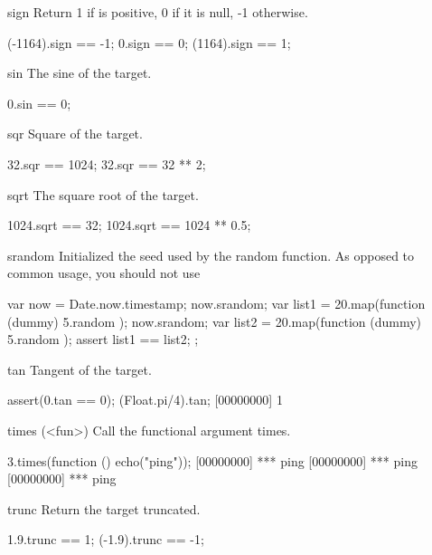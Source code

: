 \begin{urbiscriptapi}
\item[sign]
  Return 1 if \this is positive, 0 if it is null, -1
  otherwise.
\begin{urbiassert}
(-1164).sign == -1;
0.sign       == 0;
(1164).sign  == 1;
\end{urbiassert}

\item[sin]
  The sine of the target.
\begin{urbiassert}
0.sin == 0;
\end{urbiassert}

\item[sqr]
  Square of the target.
\begin{urbiassert}
32.sqr == 1024;
32.sqr == 32 ** 2;
\end{urbiassert}

\item[sqrt]
  The square root of the target.
\begin{urbiassert}
1024.sqrt == 32;
1024.sqrt == 1024 ** 0.5;
\end{urbiassert}

\item[srandom]
  Initialized the seed used by the random function.  As opposed to common
  usage, you should not use
\begin{urbiunchecked}
{
  var now = Date.now.timestamp;
  now.srandom;
  var list1 = 20.map(function (dummy) { 5.random });
  now.srandom;
  var list2 = 20.map(function (dummy) { 5.random });
  assert
  {
    list1 == list2;
  }
};
\end{urbiunchecked}

\item[tan]
  Tangent of the target.
\begin{urbiscript}
assert(0.tan == 0);
(Float.pi/4).tan;
[00000000] 1
\end{urbiscript}

\item[times](<fun>)%
  Call the functional argument  \this times.

\begin{urbiscript}
3.times(function () { echo("ping")});
[00000000] *** ping
[00000000] *** ping
[00000000] *** ping
\end{urbiscript}

\item[trunc]
  Return the target truncated.
\begin{urbiassert}
1.9.trunc == 1;
(-1.9).trunc == -1;
\end{urbiassert}


\end{urbiscriptapi}
